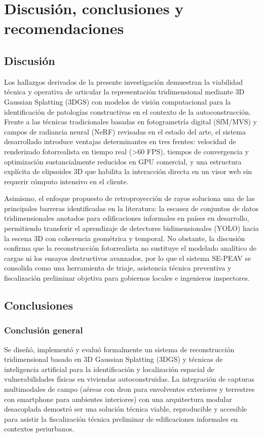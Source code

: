 \documentclass[12pt,oneside]{report}
\begin{document}
\chapter{Discusión, conclusiones y recomendaciones}

\section{Discusión}
Los hallazgos derivados de la presente investigación demuestran la viabilidad técnica y operativa de articular la representación tridimensional mediante 3D Gaussian Splatting (3DGS) con modelos de visión computacional para la identificación de patologías constructivas en el contexto de la autoconstrucción. Frente a las técnicas tradicionales basadas en fotogrametría digital (SfM/MVS) y campos de radiancia neural (NeRF) revisadas en el estado del arte, el sistema desarrollado introduce ventajas determinantes en tres frentes: velocidad de renderizado fotorrealista en tiempo real (>60 FPS), tiempos de convergencia y optimización sustancialmente reducidos en GPU comercial, y una estructura explícita de elipsoides 3D que habilita la interacción directa en un visor web sin requerir cómputo intensivo en el cliente. 

Asimismo, el enfoque propuesto de retroproyección de rayos soluciona una de las principales barreras identificadas en la literatura: la escasez de conjuntos de datos tridimensionales anotados para edificaciones informales en países en desarrollo, permitiendo transferir el aprendizaje de detectores bidimensionales (YOLO) hacia la escena 3D con coherencia geométrica y temporal. No obstante, la discusión confirma que la reconstrucción fotorrealista no sustituye el modelado analítico de cargas ni los ensayos destructivos avanzados, por lo que el sistema SE-PEAV se consolida como una herramienta de triaje, asistencia técnica preventiva y fiscalización preliminar objetiva para gobiernos locales e ingenieros inspectores.\par

\section{Conclusiones}

\subsection{Conclusión general}
Se diseñó, implementó y evaluó formalmente un sistema de reconstrucción tridimensional basado en 3D Gaussian Splatting (3DGS) y técnicas de inteligencia artificial para la identificación y localización espacial de vulnerabilidades físicas en viviendas autoconstruidas. La integración de capturas multimodales de campo (aéreas con dron para envolventes exteriores y terrestres con smartphone para ambientes interiores) con una arquitectura modular desacoplada demostró ser una solución técnica viable, reproducible y accesible para asistir la fiscalización técnica preliminar de edificaciones informales en contextos periurbanos.\par
\end{document}
